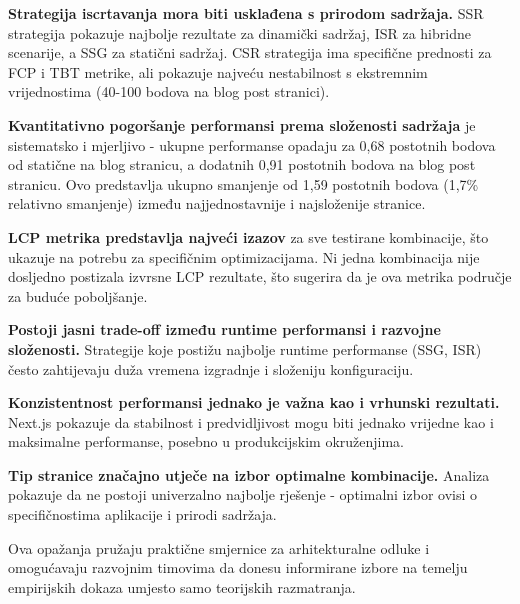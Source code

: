 \textbf{Strategija iscrtavanja mora biti usklađena s prirodom sadržaja.} SSR strategija pokazuje najbolje rezultate za dinamički sadržaj, ISR za hibridne scenarije, a SSG za statični sadržaj. CSR strategija ima specifične prednosti za FCP i TBT metrike, ali pokazuje najveću nestabilnost s ekstremnim vrijednostima (40-100 bodova na blog post stranici).

\textbf{Kvantitativno pogoršanje performansi prema složenosti sadržaja} je sistematsko i mjerljivo - ukupne performanse opadaju za 0,68 postotnih bodova od statične na blog stranicu, a dodatnih 0,91 postotnih bodova na blog post stranicu. Ovo predstavlja ukupno smanjenje od 1,59 postotnih bodova (1,7\% relativno smanjenje) između najjednostavnije i najsloženije stranice.

\textbf{LCP metrika predstavlja najveći izazov} za sve testirane kombinacije, što ukazuje na potrebu za specifičnim optimizacijama. Ni jedna kombinacija nije dosljedno postizala izvrsne LCP rezultate, što sugerira da je ova metrika područje za buduće poboljšanje.

\textbf{Postoji jasni trade-off između runtime performansi i razvojne složenosti.} Strategije koje postižu najbolje runtime performanse (SSG, ISR) često zahtijevaju duža vremena izgradnje i složeniju konfiguraciju.

\textbf{Konzistentnost performansi jednako je važna kao i vrhunski rezultati.} Next.js pokazuje da stabilnost i predvidljivost mogu biti jednako vrijedne kao i maksimalne performanse, posebno u produkcijskim okruženjima.

\textbf{Tip stranice značajno utječe na izbor optimalne kombinacije.} Analiza pokazuje da ne postoji univerzalno najbolje rješenje - optimalni izbor ovisi o specifičnostima aplikacije i prirodi sadržaja.

Ova opažanja pružaju praktične smjernice za arhitekturalne odluke i omogućavaju razvojnim timovima da donesu informirane izbore na temelju empirijskih dokaza umjesto samo teorijskih razmatranja.
